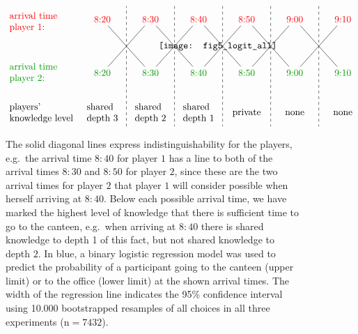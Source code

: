 \begin{figure} %
\[
  \begin{tikzpicture}[align=left,xscale=0.9]
   \node[anchor=west] at (-1.0,-2.5) {players' \\ knowledge level}; %
   \node[anchor=west,red] at (-1.0,0.9) {arrival time \\ player 1:};
   \node[anchor=west,mygreen] at (-1.0,-1) {arrival time \\ player 2:};
   \node[red] (n1820) at (3,1) {8{:}20};
   \node[mygreen] (n2820) at (3,-1) {8{:}20};
    \node[red] (n1830) at (5,1) {8{:}30};
   \node[mygreen] (n2830) at (5,-1) {8{:}30};
   \draw[-] (n1820) to (n2830);
   \draw[-] (n2820) to (n1830);
  \draw[dashed] (4,-3) to (4,1.5);
    \node[red] (n1840) at (7,1) {8{:}40};
   \node[mygreen] (n2840) at (7,-1) {8{:}40};
    \node[red] (n1850) at (9,1) {8{:}50};
   \node[mygreen] (n2850) at (9,-1) {8{:}50};
     \draw[-] (n2840) to (n1850);
   \draw[-] (n1840) to (n2850);
   \draw[-] (n1830) to (n2840);
   \draw[-] (n2830) to (n1840);
  \draw[dashed] (6,1.5) to (6,-3);
  \draw[dashed] (8,1.5) to (8,-3);
     \node[red] (n1900) at (11,1) {9{:}00};
   \node[mygreen] (n2900) at (11,-1) {9{:}00};
    \node[red] (n1910) at (13,1) {9{:}10};
   \node[mygreen] (n2910) at (13,-1) {9{:}10};
     \draw[-] (n2850) to (n1900);
   \draw[-] (n1850) to (n2900);
   \draw[-] (n1900) to (n2910);
   \draw[-] (n2900) to (n1910);
  \draw[dashed] (12,1.5) to (12,-3);
  \draw[dashed] (10,1.5) to (10,-3);
  \node at (13,-2.5) {none};
  \node at (11,-2.5) {none};
  \node at (9,-2.5) {private};
  \node at (7,-2.5) {shared\\ depth 1};
  \node at (5,-2.5) {shared\\ depth 2};
 \node at (3,-2.5) {shared\\ depth 3};
 \node at (7.8,0)
 	{\texttt{[image: fig5\_logit\_all]}};
  \end{tikzpicture}
  \]
  \caption{The solid diagonal lines express indistinguishability for the players, e.g.\ the arrival time $8{:}40$ for player $1$ has a line to both of the arrival times $8{:}30$ and $8{:}50$ for player $2$, since these are the two arrival times for player $2$ that player $1$ will consider possible when herself arriving at $8{:}40$. Below each possible arrival time, we have marked the highest level of knowledge that there is sufficient time to go to the canteen, e.g.\ when arriving at $8{:}40$ there is shared knowledge to depth 1 of this fact, but not shared knowledge to depth $2$. In blue, a binary logistic regression model was used to predict the probability of a participant going to the canteen (upper limit) or to the office (lower limit) at the shown arrival times. The width of the regression line indicates the 95\% confidence interval using 10.000 bootstrapped resamples of all choices in all three experiments ($\text{n}=7432$).
  }\label{fig:indistinguish}
\end{figure}
